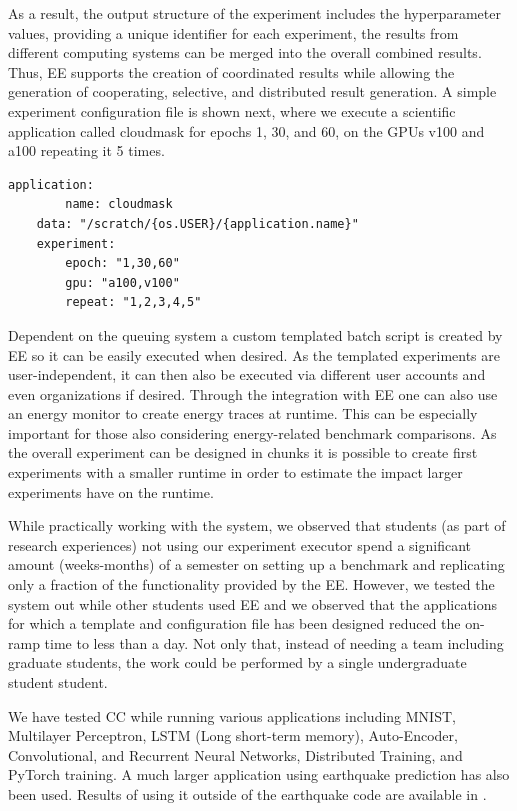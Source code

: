 \documentclass[utf8]{FrontiersinVancouver} %
\begin{document}
As a result, the output structure of the experiment includes the hyperparameter values, providing a unique identifier for each experiment, the results from different computing systems can be merged into the overall combined results. Thus, EE supports the creation of coordinated results while allowing the generation of cooperating, selective, and distributed result generation. A simple experiment configuration file is shown next, where we execute a scientific application called cloudmask \citep{cloudmesh-cc,cloudmask-ee} for epochs 1, 30, and 60, on the GPUs v100 and a100 repeating it 5 times.

{\scriptsize
\begin{lstlisting}[breaklines=true]
    application:
        name: cloudmask
    data: "/scratch/{os.USER}/{application.name}"
    experiment:
        epoch: "1,30,60"
        gpu: "a100,v100"
        repeat: "1,2,3,4,5"
\end{lstlisting}
}

Dependent on the queuing system a custom templated batch script is created by EE so it can be easily executed when desired.
As the templated experiments are user-independent, it can then also be executed via different user accounts and even organizations if desired. Through the integration with EE one can also use an energy monitor to create energy traces at runtime. This can be especially important for those also considering energy-related benchmark comparisons. As the overall experiment can be designed in chunks it is possible to create first experiments with a smaller runtime in order to estimate the impact larger experiments have on the runtime. 

While practically working with the system, we observed that students (as part of research experiences) not using our experiment executor spend a significant amount (weeks-months) of a semester on setting up a benchmark and replicating only a fraction of the functionality provided by the EE. However, we tested the system out while other students used EE and we observed that the applications for which a template and configuration file has been designed reduced the on-ramp time to less than a day. Not only that, instead of needing a team including graduate students, the work could be performed by a single undergraduate student student.

We have tested CC while running various applications including MNIST, Multilayer Perceptron, LSTM (Long short-term memory), Auto-Encoder, Convolutional, and Recurrent Neural Networks, Distributed Training, and PyTorch training.  A much larger application using earthquake prediction has also been used. Results of using it outside of the earthquake code are available in 
\cite{las-2023-escience}.
\end{document}
